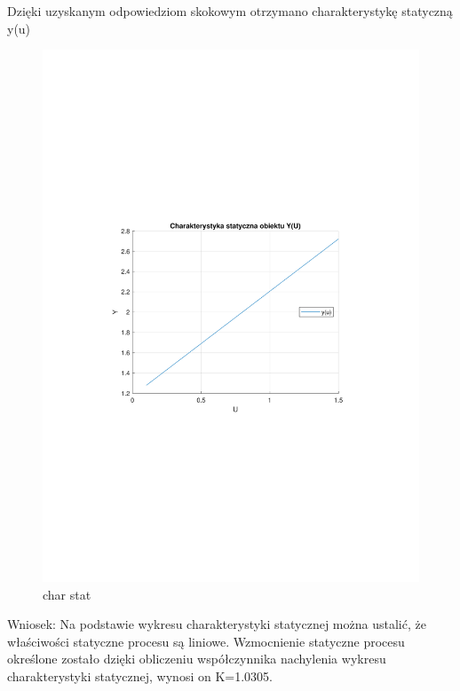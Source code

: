 Dzięki uzyskanym odpowiedziom skokowym otrzymano charakterystykę statyczną y(u)
\begin{figure}[H]
    \centering
    \includegraphics[scale=0.8]{../projekt/zad2/Dane/char_stat.pdf}
    \caption{char stat}
\end{figure}

Wniosek: 
Na podstawie wykresu charakterystyki statycznej można ustalić, 
że właściwości statyczne procesu są liniowe. 
Wzmocnienie statyczne procesu określone zostało dzięki obliczeniu współczynnika nachylenia 
wykresu charakterystyki statycznej, wynosi on K=\num{1.0305}.
